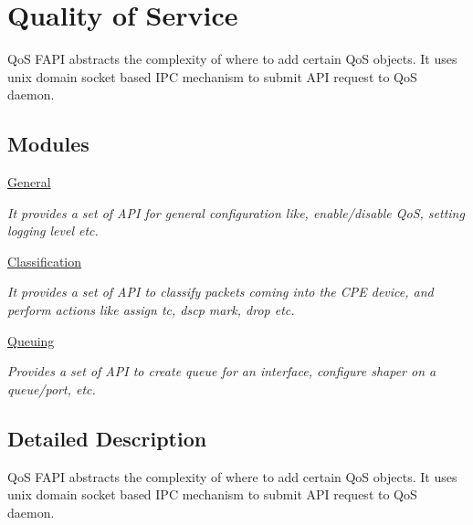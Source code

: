 \hypertarget{group__FAPI__QOS}{\section{Quality of Service}
\label{group__FAPI__QOS}
}


Qo\-S F\-A\-P\-I abstracts the complexity of where to add certain Qo\-S objects. It uses unix domain socket based I\-P\-C mechanism to submit A\-P\-I request to Qo\-S daemon.  


\subsection*{Modules}
\begin{DoxyCompactItemize}
\item 
\hyperlink{group__FAPI__QOS__GENERAL}{General}
\begin{DoxyCompactList}\small\item\em It provides a set of A\-P\-I for general configuration like, enable/disable Qo\-S, setting logging level etc. \end{DoxyCompactList}\item 
\hyperlink{group__FAPI__QOS__CLASS}{Classification}
\begin{DoxyCompactList}\small\item\em It provides a set of A\-P\-I to classify packets coming into the C\-P\-E device, and perform actions like assign tc, dscp mark, drop etc. \end{DoxyCompactList}\item 
\hyperlink{group__FAPI__QOS__QUEUE}{Queuing}
\begin{DoxyCompactList}\small\item\em Provides a set of A\-P\-I to create queue for an interface, configure shaper on a queue/port, etc. \end{DoxyCompactList}\end{DoxyCompactItemize}


\subsection{Detailed Description}
Qo\-S F\-A\-P\-I abstracts the complexity of where to add certain Qo\-S objects. It uses unix domain socket based I\-P\-C mechanism to submit A\-P\-I request to Qo\-S daemon. 